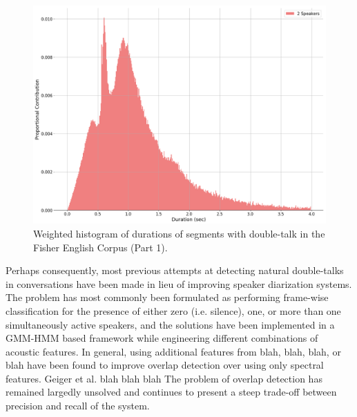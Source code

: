 \documentclass[a4paper]{article}
\begin{document}
\begin{figure}[t]
  \centering
  \includegraphics[width=\linewidth]{figures/dt-dist.png}
  \caption{Weighted histogram of durations of segments with double-talk in the Fisher English Corpus (Part 1).}
  \label{fig:dt-dist}
\end{figure}

Perhaps consequently, most previous attempts at detecting natural double-talks in conversations
have been made in lieu of improving speaker diarization systems.
The problem has most commonly been formulated as performing frame-wise classification
for the presence of either
zero (i.e. silence), one, or more than one simultaneously active speakers,
and the solutions have been implemented in a GMM-HMM based framework
while engineering different combinations of acoustic features.
In general, using additional features from blah, blah, blah, or blah %
have been found to improve overlap detection over using only spectral features.
Geiger et al. blah blah blah  %
The problem of overlap detection has remained largedly unsolved and
continues to present a steep trade-off between precision and recall of the system.
\end{document}
